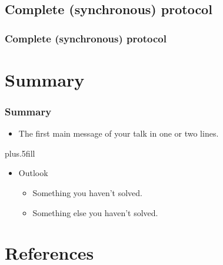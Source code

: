 \documentclass[10 pt]{beamer}
\begin{document}
\subsection{Complete (synchronous) protocol}


\begin{frame}
\frametitle{Complete (synchronous) protocol}



\end{frame}



\section*{Summary}


\begin{frame}
\frametitle<presentation>{Summary}

\begin{itemize}
  \item The \alert{first main message} of your talk in one or two lines.
\end{itemize}

\vskip0pt plus.5fill
\begin{itemize}
  \item Outlook
  \begin{itemize}
    \item Something you haven't solved.
    \item Something else you haven't solved.
  \end{itemize}
\end{itemize}

\end{frame}



\section*{References}
\end{document}

